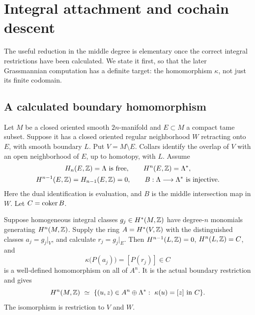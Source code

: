 \section{Integral attachment and cochain descent}\label{sec:integral}

The useful reduction in the middle degree is elementary once the
correct integral restrictions have been calculated. We state it
first, so that the later Grassmannian computation has a definite
target: the homomorphism \(\kappa\), not just its finite codomain.

\subsection{A calculated boundary homomorphism}
Let \(M\) be a closed oriented smooth \(2n\)-manifold and \(E\subset M\)
a compact tame subset. Suppose it has a closed oriented regular
neighborhood \(W\) retracting onto \(E\), with smooth boundary \(L\).
Put \(V=M\setminus E\). Collars identify the overlap of \(V\) with an
open neighborhood of \(E\), up to homotopy, with \(L\).
Assume
\begin{equation}\label{eq:attachment-assumptions}
 \begin{gathered}
 H_n(E,\mathbb Z)=\Lambda\ \text{is free},\qquad H^n(E,\mathbb Z)=\Lambda^*,\\
 H^{n-1}(E,\mathbb Z)=H_{n-1}(E,\mathbb Z)=0,\qquad
 B:\Lambda\longrightarrow\Lambda^*\ \text{is injective}.
 \end{gathered}
\end{equation}
Here the dual identification is evaluation, and \(B\) is the middle
intersection map in \(W\). Let \(C=\operatorname{coker} B\).

\begin{theorem}\label{thm:attachment}
Suppose homogeneous integral classes \(g_j\in H^*(M,\mathbb Z)\) have
degree-\(n\) monomials generating \(H^n(M,\mathbb Z)\).
Supply the ring \(A=H^*(V,\mathbb Z)\) with the distinguished classes
\(a_j=g_j|_V\), and calculate \(r_j=g_j|_E\).
Then \(H^{n-1}(L,\mathbb Z)=0\), \(H^n(L,\mathbb Z)=C\), and
\begin{equation}\label{eq:kappa}
 \kappa\bigl(P(a_j)\bigr)=[P(r_j)]\in C
\end{equation}
is a well-defined homomorphism on all of \(A^n\).
It is the actual boundary restriction and gives
\begin{equation}\label{eq:fibre-product}
 H^n(M,\mathbb Z)\ \simeq\
 \{(u,z)\in A^n\oplus\Lambda^*:\ \kappa(u)=[z]\text{ in }C\}.
\end{equation}
The isomorphism is restriction to \(V\) and \(W\).
\end{theorem}


